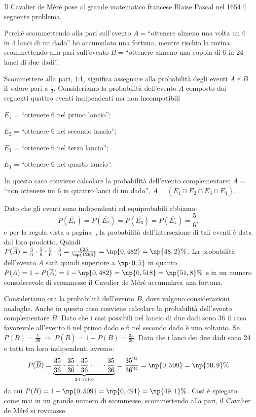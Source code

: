 Il Cavalier de Méré pose al grande matematico francese Blaise Pascal nel 1654 il seguente problema.
\begin{problema}
Perché scommettendo alla pari sull'evento $A=$``ottenere almeno una volta un 6 in 4 lanci di un dado'' ho accumulato una fortuna, mentre rischio la rovina scommettendo alla pari sull'evento $B=$``ottenere almeno una coppia di 6 in 24 lanci di due dadi''.
\end{problema}
Scommettere alla pari, 1:1, significa assegnare alla probabilità degli eventi $A$ e $B$ il valore pari a $\frac 1 2$.
Consideriamo la probabilità dell'evento $A$ composto dai seguenti quattro eventi indipendenti ma non incompatibili
\begin{multicols}{2}
\begin{description*}
\item $E_1=$``ottenere 6 nel primo lancio'';
\item $E_2=$``ottenere 6 nel secondo lancio'';
\item $E_3=$``ottenere 6 nel terzo lancio'';
\item $E_4=$``ottenere 6 nel quarto lancio''.
\end{description*}
\end{multicols}
In questo caso conviene calcolare la probabilità dell'evento complementare: $\overline A=$``non ottenere un 6 in quattro lanci di un dado'', $\overline A=(\overline{E_1}\cap \overline{E_2}\cap \overline{E_3}\cap \overline{E_4})$.

Dato che gli eventi sono indipendenti ed equiprobabili abbiamo: \[ P(\overline{E_1})=P(\overline{E_2})=P(\overline{E_3})=P(\overline{E_4})=\frac 5 6. \]
e per la regola vista a pagina~\pageref{reg:probabilita_intersezione_eventi_indipendenti}, la probabilità dell'intersezione di tali eventi è data dal loro prodotto. Quindi $P(\overline A)=\frac 5 6\cdot \frac 5 6\cdot \frac 5 6\cdot \frac 5 6=\frac{625}{\np{1296}}=\np{0,482}=\np{48,2}\%$.
La probabilità dell'evento $A$ sarà quindi superiore a $\np{0,5}$ in quanto $P(A)=1-P(\overline A)=1-\np{0,482}=\np{0,518}=\np{51,8}\%$ e in un numero considerevole di scommesse il Cavalier de Méré accumulava una fortuna.

Consideriamo ora la probabilità dell'evento $B$, dove valgono considerazioni analoghe. Anche in questo caso conviene calcolare la probabilità dell'evento complementare $\overline B$. Dato che i casi possibili nel lancio di due dadi sono 36 il caso favorevole all'evento 6 nel primo dado e 6 nel secondo dado è uno soltanto. Se $P(B)=\frac 1{36} \:\Rightarrow\: P(\overline B)=1-P(B)=\frac{35}{36}$. Dato che i lanci dei due dadi sono 24 e tutti tra loro indipendenti avremo:
\[ P(\overline B)=\underbrace{\frac{35}{36}\cdot\frac{35}{36}\cdot\frac{35}{36}\cdot\ldots\cdot\frac{35}{36}}_{24\text{ volte}}=\frac{35^{24}}{36^{24}}=\np{0,509}=\np{50,9}\% \]
da cui $P(B)=1-\np{0,509}=\np{0,491}=\np{49,1}\%$. Così è spiegato come mai in un grande numero di scommesse, scommettendo alla pari, il Cavalier de Méré si rovinasse.

